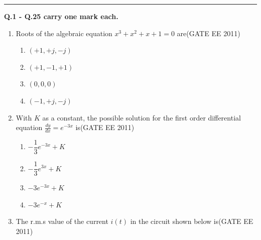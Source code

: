 \documentclass[a4paper,10pt]{exam}
\theoremstyle{remark}
\begin{document}
\noindent\rule{\textwidth}{0.4pt}
\raggedright{\textbf{Q.1 - Q.25 carry one mark each.}}

\vspace{0.4cm}

\begin{enumerate}
    

\item \quad Roots of the algebraic equation $
x^3 + x^2 + x + 1 = 0
$ are\hfill{(GATE EE 2011)}

\begin{multicols}{4}
\begin{enumerate}
    \item $(+1, +j, -j)$
\item $(+1, -1, +1)$
\item $(0, 0, 0)$
\item $(-1, +j, -j)$
\end{enumerate}
\end{multicols}

\item \quad With $K$ as a constant, the possible solution for the first order differential equation
$
\frac{dy}{dx} = e^{-3x}
$
is\hfill{(GATE EE 2011)}

\begin{multicols}{4}
\begin{enumerate}
   \item $-\dfrac{1}{3}e^{-3x} + K$
\item $-\dfrac{1}{3}e^{3x} + K$
\item $-3e^{-3x} + K$
\item $-3e^{-x} + K$
\end{enumerate}
\end{multicols}

\item \quad The r.m.s value of the current $i(t)$ in the circuit shown below is\hfill{(GATE EE 2011)}


\end{enumerate}
\end{document}
